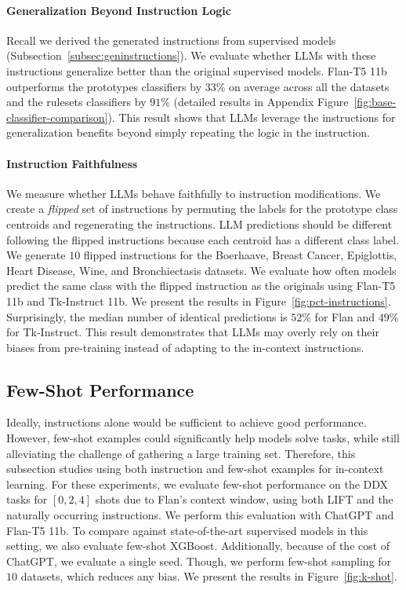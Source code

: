 \paragraph{Generalization Beyond Instruction Logic} Recall we derived the generated instructions from supervised models (Subsection~\ref{subsec:geninstructions}).
We evaluate whether LLMs with these instructions generalize better than the original supervised models. Flan-T5 11b outperforms the prototypes classifiers by $33\%$ on average across all the datasets and the rulesets classifiers by $91\%$ (detailed results in Appendix Figure~\ref{fig:base-classifier-comparison}).
This result shows that LLMs leverage the instructions for generalization benefits beyond simply repeating the logic in the instruction.

\paragraph{Instruction Faithfulness} We measure whether LLMs behave faithfully to instruction modifications. We create a \textit{flipped} set of instructions by permuting the labels for the prototype class centroids and regenerating the instructions. LLM predictions should be different following the flipped instructions because each centroid has a different class label. We generate $10$ flipped instructions for the Boerhaave, Breast Cancer, Epiglottis, Heart Disease, Wine, and Bronchiectasis datasets. We evaluate how often models predict the same class with the flipped instruction as the originals using Flan-T5 11b and Tk-Instruct 11b. We present the results in Figure~\ref{fig:pct-instructions}.
Surprisingly, the median number of identical predictions is $52\%$ for Flan and $49\%$ for Tk-Instruct. This result demonstrates that LLMs may overly rely on their biases from pre-training instead of adapting to the in-context instructions.

\subsection{Few-Shot Performance} Ideally, instructions alone would be sufficient to achieve good performance. However, few-shot examples could significantly help models solve tasks, while still alleviating the challenge of gathering a large training set. Therefore, this subsection studies using both instruction and few-shot examples for in-context learning. For these experiments, we evaluate few-shot performance on the DDX tasks for $[0, 2, 4]$ shots due to Flan's context window, using both LIFT and the naturally occurring instructions. We perform this evaluation with ChatGPT and Flan-T5 11b. To compare against state-of-the-art supervised models in this setting, we also evaluate few-shot XGBoost. Additionally, because of the cost of ChatGPT, we evaluate a single seed. Though, we perform few-shot sampling for $10$ datasets, which reduces any bias. We present the results in Figure~\ref{fig:k-shot}.

